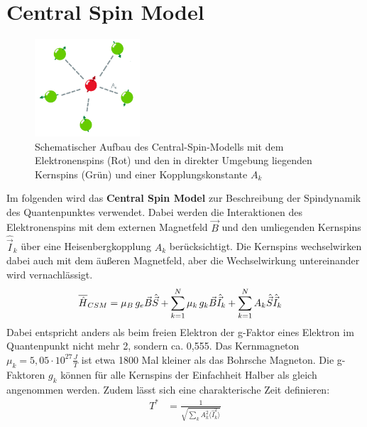 \chapter{Central Spin Model}

\begin{figure}
    \centering
    \includegraphics[width = 0.35\textwidth]{Abbildungen/CSM_Schema_Salem.png}
    \caption{Schematischer Aufbau des Central-Spin-Modells mit dem Elektronenspins (Rot) und den in direkter Umgebung liegenden 
    Kernspins (Grün) und einer Kopplungskonstante $A_k$}
    \label{fig:CSM}
\end{figure}
Im folgenden wird das \textbf{Central Spin Model} zur Beschreibung der Spindynamik des Quantenpunktes verwendet. Dabei werden die Interaktionen des 
Elektronenspins mit dem externen Magnetfeld $\vec{B}$ und den umliegenden Kernspins $\hat{\vec{I}}_k$ über eine Heisenbergkopplung $A_k$ berücksichtigt.
Die Kernspins wechselwirken dabei auch mit dem äußeren Magnetfeld, aber die Wechselwirkung untereinander wird vernachlässigt.
\begin{align}
    \overline{\hat{H}}_{CSM} &= \mu_B\thinspace g_e \vec{B}\hat{\vec{S}} +  \sum_{k=1}^{N}\mu_k\thinspace g_k\vec{B}\hat{\vec{I}}_k + \sum_{k=1}^{N} A_k \hat{\vec{S}}\hat{\vec{I}}_k
\end{align}
Dabei entspricht anders als beim freien Elektron der g-Faktor eines Elektron im Quantenpunkt nicht mehr 2, sondern ca. 0,555. %
Das Kernmagneton $\mu_k= 5,05 \cdot 10^{27} \frac{J}{T}$ ist etwa 1800 Mal kleiner als das Bohrsche Magneton.
Die g-Faktoren $g_k$ können für alle Kernspins der Einfachheit Halber als gleich angenommen werden. Zudem lässt sich eine charakterische Zeit
definieren:
\begin{align}
    T^* &= \frac{1}{\sqrt{\sum_k A_k^2\langle \hat{I}_k^2 \rangle}}
\end{align}
